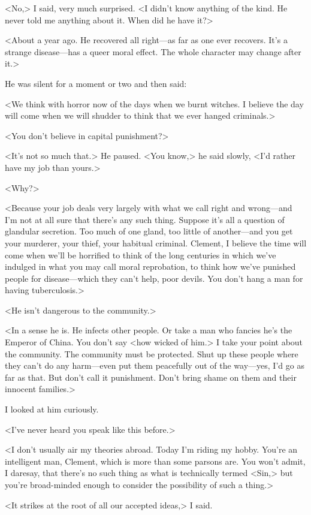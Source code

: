 <No,> I said, very much surprised. <I didn't know anything of the kind. He never told me anything about it. When did he have it?>

<About a year ago. He recovered all right—as far as one ever recovers. It's a strange disease—has a queer moral effect. The whole character may change after it.>

He was silent for a moment or two and then said:

<We think with horror now of the days when we burnt witches. I believe the day will come when we will shudder to think that we ever hanged criminals.>

<You don't believe in capital punishment?>

<It's not so much that.> He paused. <You know,> he said slowly, <I'd rather have my job than yours.>

<Why?>

<Because your job deals very largely with what we call right and wrong—and I'm not at all sure that there's any such thing. Suppose it's all a question of glandular secretion. Too much of one gland, too little of another—and you get your murderer, your thief, your habitual criminal. Clement, I believe the time will come when we'll be horrified to think of the long centuries in which we've indulged in what you may call moral reprobation, to think how we've punished people for disease—which they can't help, poor devils. You don't hang a man for having tuberculosis.>

<He isn't dangerous to the community.>

<In a sense he is. He infects other people. Or take a man who fancies he's the Emperor of China. You don't say <how wicked of him.> I take your point about the community. The community must be protected. Shut up these people where they can't do any harm—even put them peacefully out of the way—yes, I'd go as far as that. But don't call it punishment. Don't bring shame on them and their innocent families.>

I looked at him curiously.

<I've never heard you speak like this before.>

<I don't usually air my theories abroad. Today I'm riding my hobby. You're an intelligent man, Clement, which is more than some parsons are. You won't admit, I daresay, that there's no such thing as what is technically termed <Sin,> but you're broad-minded enough to consider the possibility of such a thing.>

<It strikes at the root of all our accepted ideas,> I said.

